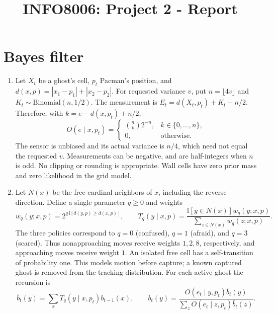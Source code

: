 \documentclass{article}
\begin{document}

\title{\Large{INFO8006: Project 2 - Report}}
\vspace{1cm}
\author{}

\maketitle


\section{Bayes filter}

\begin{enumerate}[label=\alph*.,leftmargin=*]
    \item Let $X_t$ be a ghost's cell, $p_t$ Pacman's position,
    and $d(x,p)=|x_1-p_1|+|x_2-p_2|$. For requested variance $v$,
    put $n=\lfloor4v\rfloor$ and $K_t\sim\mathrm{Binomial}(n,1/2)$.
    The measurement is $E_t=d(X_t,p_t)+K_t-n/2$. Therefore, with
    $k=e-d(x,p_t)+n/2$,
    \[
      O(e\mid x,p_t)=
      \begin{cases}\binom{n}{k}2^{-n},& k\in\{0,\ldots,n\},\\
      0,&\text{otherwise.}\end{cases}
    \]
    The sensor is unbiased and its actual variance is $n/4$, which need
    not equal the requested $v$. Measurements can be negative, and are
    half-integers when $n$ is odd. No clipping or rounding is appropriate.
    Wall cells have zero prior mass and zero likelihood in the grid model.

    \item Let $N(x)$ be the free cardinal neighbors of $x$, including the
    reverse direction. Define a single parameter $q\geq0$ and weights
    \[
    w_q(y;x,p)=2^{q\,\mathbb{I}[d(y,p)\geq d(x,p)]},\qquad
    T_q(y\mid x,p)=
      \frac{\mathbb{I}[y\in N(x)]w_q(y;x,p)}
           {\sum_{z\in N(x)}w_q(z;x,p)}.
    \]
    The three policies correspond to $q=0$ (confused), $q=1$ (afraid),
    and $q=3$ (scared). Thus nonapproaching moves receive weights $1,2,8$,
    respectively, and approaching moves receive weight $1$.
    An isolated free cell has a self-transition of probability one.
    This models motion before capture; a known captured ghost is removed
    from the tracking distribution. For each active ghost the recursion is
    \[
    \bar b_t(y)=\sum_x T_q(y\mid x,p_t)b_{t-1}(x),\qquad
    b_t(y)=\frac{O(e_t\mid y,p_t)\bar b_t(y)}
                  {\sum_z O(e_t\mid z,p_t)\bar b_t(z)}.
    \]
\end{enumerate}
\end{document}
